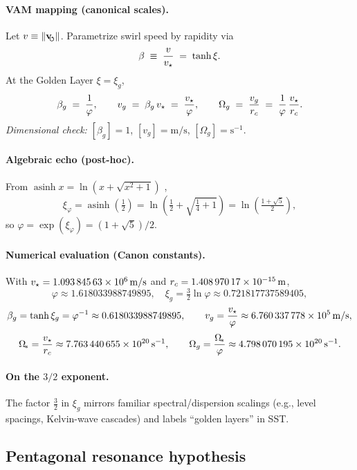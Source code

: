 \documentclass[11pt, preprint,titlepage]{revtex4-2}
\newcommand{\swirlarrow}{\!\!\scriptsize\boldsymbol{\circlearrowleft}}
\newcommand{\vswirl}{\mathbf{v}_{\swirlarrow}}
\begin{document}
	\paragraph*{VAM mapping (canonical scales).}
	Let \(v\equiv\|\vswirl\|\). Parametrize swirl speed by rapidity via
	\[
		\beta \;\equiv\; \frac{v}{v_\star} \;=\; \tanh\xi.
	\]
	At the Golden Layer \(\xi=\xi_g\),
	\[
		\beta_g \;=\; \frac{1}{\varphi},\qquad
		v_g \;=\; \beta_g\,v_\star \;=\; \frac{v_\star}{\varphi},\qquad
		\Omega_g \;=\; \frac{v_g}{r_c} \;=\; \frac{1}{\varphi}\,\frac{v_\star}{r_c}.
	\]
	\emph{Dimensional check:} \([\beta_g]=1\), \([v_g]=\mathrm{m/s}\), \([\Omega_g]=\mathrm{s}^{-1}\).

	\paragraph*{Algebraic echo (post-hoc).}
	From \(\operatorname{asinh}x=\ln(x+\sqrt{x^2+1})\) \cite{NISTDLMF},
	\[
		\xi_\varphi=\operatorname{asinh}\!\left(\tfrac{1}{2}\right)
		=\ln\!\left(\tfrac{1}{2}+\sqrt{\tfrac{1}{4}+1}\right)
		=\ln\!\left(\tfrac{1+\sqrt5}{2}\right),
	\]
	so \(\varphi=\exp(\xi_\varphi)=(1+\sqrt5)/2\).

	\paragraph*{Numerical evaluation (Canon constants).}
	With \(v_\star=\SI{1.09384563e6}{m/s}\) and \(r_c=\SI{1.40897017e-15}{m}\),
	\[
		\varphi \approx 1.618033988749895,\quad
		\xi_g=\tfrac{3}{2}\ln\varphi \approx 0.721817737589405,
	\]
	\[
		\beta_g=\tanh\xi_g=\varphi^{-1}\approx 0.618033988749895,\qquad
		v_g=\frac{v_\star}{\varphi}\approx \SI{6.760337778e5}{m/s},
	\]
	\[
		\Omega_{\!*}=\frac{v_\star}{r_c}\approx \SI{7.763440655e20}{s^{-1}},\qquad
		\Omega_g=\frac{\Omega_{\!*}}{\varphi}\approx \SI{4.798070195e20}{s^{-1}}.
	\]

	\paragraph*{On the \(3/2\) exponent.}
	The factor \(\tfrac{3}{2}\) in \(\xi_g\) mirrors familiar spectral/dispersion scalings (e.g., level spacings, Kelvin-wave cascades) and labels “golden layers” in SST.

	\subsection{Pentagonal resonance hypothesis}
\end{document}

